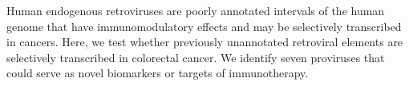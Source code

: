 Human endogenous retroviruses are poorly annotated intervals of the human genome that have immunomodulatory effects and may be selectively transcribed in cancers.
Here, we test whether previously unannotated retroviral elements are selectively transcribed in colorectal cancer.
We identify seven proviruses that could serve as novel biomarkers or targets of immunotherapy.
